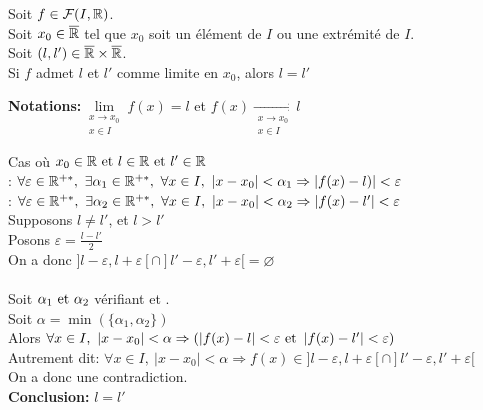 \documentclass[12pt,twoside,a4paper]{article}
\begin{document}
		\begin{prop}
			Soit $f\in \mathcal{F}(I,\mathbb{R})$.\\
			Soit $x_0\in \overline{\mathbb{R}}$ tel que $x_0$ soit un \'el\'ement de $I$ ou une extr\'emit\'e de $I$.\\
			Soit $(l,l')\in \overline{\mathbb{R}}\times \overline{\mathbb{R}}$.\\
			Si $f$ admet $l$ et $l'$ comme limite en $x_0$, alors $l=l'$
		\end{prop}
		\begin{flushleft}
			\textbf{Notations:}$\lim\limits_{\substack{x\rightarrow x_0 \\x\in I}} f(x)=l$ et $f(x) \mathop{\longrightarrow}\limits_{\substack{x\rightarrow x_0\\x\in I}} l$\\
		\end{flushleft}
		\begin{preuve}
			Cas o\`u $x_0\in\mathbb{R} \text{ et } l\in\mathbb{R}\text{ et } l'\in\mathbb{R}$\\
			 : $\forall \varepsilon\in\mathbb{R}^{+*},\ \exists \alpha_1 \in \mathbb{R}^{+*},\ \forall x\in I,\ \left|x-x_0 \right|<\alpha_1 \Rightarrow \left| f(x)-l)\right| <\varepsilon$\\
			 : $\forall \varepsilon\in\mathbb{R}^{+*},\ \exists \alpha_2 \in \mathbb{R}^{+*},\ \forall x\in I,\ \left|x-x_0 \right|<\alpha_2 \Rightarrow \left| f(x)-l'\right| <\varepsilon$\\
			Supposons $l\neq l'$, et $l>l'$\\
			Posons $\varepsilon = \frac{l-l'}{2}$\\
			On a donc $]l-\varepsilon,l+\varepsilon [\cap]l'-\varepsilon, l'+\varepsilon [=\varnothing$\\
			\\
			Soit $\alpha_1 \text{ et } \alpha_2$ v\'erifiant  et .\\
			Soit $\alpha=\min(\{\alpha_1,\alpha_2 \})$\\
			Alors $\forall x\in I,\ \left|x-x_0 \right|<\alpha \Rightarrow (\left| f(x)-l\right| <\varepsilon \text{ et } \left| f(x)-l'\right| <\varepsilon)$\\
			Autrement dit: $\forall x\in I,\ \left|x-x_0 \right|<\alpha \Rightarrow f(x)\in ]l-\varepsilon,l+\varepsilon [\cap]l'-\varepsilon, l'+\varepsilon [$\\
			On a donc une contradiction.\\
			\textbf{Conclusion:} $l=l'$
		\end{preuve}
\end{document}
